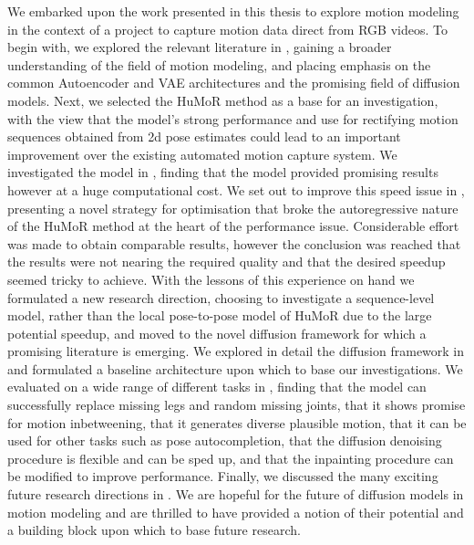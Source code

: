 We embarked upon the work presented in this thesis to explore motion modeling in the context of a project to capture motion data direct from RGB videos. To begin with, we explored the relevant literature in , gaining a broader understanding of the field of motion modeling, and placing emphasis on the common Autoencoder and VAE architectures and the promising field of diffusion models. Next, we selected the HuMoR method \cite{humor} as a base for an investigation, with the view that the model's strong performance and use for rectifying motion sequences obtained from 2d pose estimates could lead to an important improvement over the existing automated motion capture system. We investigated the model in , finding that the model provided promising results however at a huge computational cost. We set out to improve this speed issue in , presenting a novel strategy for optimisation that broke the autoregressive nature of the HuMoR method at the heart of the performance issue. Considerable effort was made to obtain comparable results, however the conclusion was reached that the results were not nearing the required quality and that the desired speedup seemed tricky to achieve. With the lessons of this experience on hand we formulated a new research direction, choosing to investigate a sequence-level model, rather than the local pose-to-pose model of HuMoR due to the large potential speedup, and moved to the novel diffusion framework for which a promising literature is emerging. We explored in detail the diffusion framework in  and formulated a baseline architecture upon which to base our investigations. We evaluated on a wide range of different tasks in , finding that the model can successfully replace missing legs and random missing joints, that it shows promise for motion inbetweening, that it generates diverse plausible motion, that it can be used for other tasks such as pose autocompletion, that the diffusion denoising procedure is flexible and can be sped up, and that the inpainting procedure can be modified to improve performance. Finally, we discussed the many exciting future research directions in . We are hopeful for the future of diffusion models in motion modeling and are thrilled to have provided a notion of their potential and a building block upon which to base future research.
